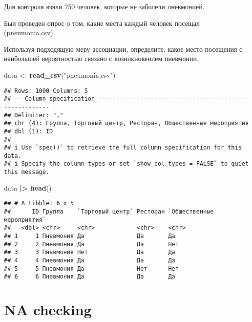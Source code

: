 \documentclass[
]{article}
\newenvironment{Shaded}{\begin{snugshade}}{\end{snugshade}}
\newcommand{\FunctionTok}[1]{\textcolor[rgb]{0.13,0.29,0.53}{\textbf{#1}}}
\newcommand{\NormalTok}[1]{#1}
\newcommand{\OtherTok}[1]{\textcolor[rgb]{0.56,0.35,0.01}{#1}}
\newcommand{\SpecialCharTok}[1]{\textcolor[rgb]{0.81,0.36,0.00}{\textbf{#1}}}
\newcommand{\StringTok}[1]{\textcolor[rgb]{0.31,0.60,0.02}{#1}}
\begin{document}
Для контроля взяли 750 человек, которые не заболели пневмонией.

Был проведен опрос о том, какие места каждый человек посещал
(pneumonia.csv).

Используя подходящую меру ассоциации, определите, какое место посещения
с наибольшей вероятностью связано с возникновением пневмонии.

\begin{Shaded}
\begin{Highlighting}[]
\NormalTok{data }\OtherTok{\textless{}{-}} \FunctionTok{read\_csv}\NormalTok{(}\StringTok{"pneumonia.csv"}\NormalTok{)}
\end{Highlighting}
\end{Shaded}

\begin{verbatim}
## Rows: 1000 Columns: 5
## -- Column specification --------------------------------------------------------
## Delimiter: ","
## chr (4): Группа, Торговый центр, Ресторан, Общественные мероприятия
## dbl (1): ID
## 
## i Use `spec()` to retrieve the full column specification for this data.
## i Specify the column types or set `show_col_types = FALSE` to quiet this message.
\end{verbatim}

\begin{Shaded}
\begin{Highlighting}[]
\NormalTok{data }\SpecialCharTok{|\textgreater{}} \FunctionTok{head}\NormalTok{()}
\end{Highlighting}
\end{Shaded}

\begin{verbatim}
## # A tibble: 6 x 5
##      ID Группа    `Торговый центр` Ресторан `Общественные мероприятия`
##   <dbl> <chr>     <chr>            <chr>    <chr>                     
## 1     1 Пневмония Да               Да       Да                        
## 2     2 Пневмония Да               Да       Нет                       
## 3     3 Пневмония Нет              Да       Да                        
## 4     4 Пневмония Да               Да       Да                        
## 5     5 Пневмония Да               Нет      Нет                       
## 6     6 Пневмония Да               Да       Да
\end{verbatim}

\section{NA checking}\label{na-checking-1}
\end{document}
